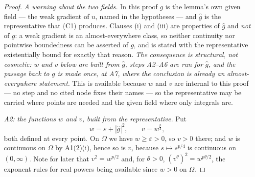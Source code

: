 \begin{proof}
\emph{A warning about the two fields.}  In this proof $g$ is the lemma's own
given field --- the weak gradient of $u$, named in the hypotheses --- and
$\hat g$ is the representative that (C1) produces.  Clauses (i) and (iii) are
properties of $\hat g$ and \emph{not} of $g$: a weak gradient is an
almost-everywhere class, so neither continuity nor pointwise boundedness can be
asserted of $g$, and  is stated with the
representative existentially bound for exactly that reason.  \emph{The
consequence is structural, not cosmetic: $w$ and $v$ below are built from
$\hat g$, steps A2--A6 are run for $\hat g$, and the passage back to $g$ is made
once, at A7, where the conclusion is already an almost-everywhere statement.}
This is available because $w$ and $v$ are internal to this proof --- no step and
no cited node fixes their names --- so the representative may be carried where
points are needed and the given field where only integrals are.

\emph{A2: the functions $w$ and $v$, built from the representative.}  Put
\[
w=\varepsilon+|\hat g|^2,\qquad v=w^{\frac p4},
\]
both defined at every point.  On $\Omega$ we have $w\ge\varepsilon>0$, so $v>0$
there; and $w$ is continuous on $\Omega$ by A1(2)(i), hence so is $v$, because
$s\mapsto s^{p/4}$ is continuous on $(0,\infty)$.  Note for later that
$v^2=w^{p/2}$ and, for $\theta>0$, $(v^\theta)^2=w^{p\theta/2}$, the exponent
rules for real powers being available since $w>0$ on $\Omega$.


\end{proof}
